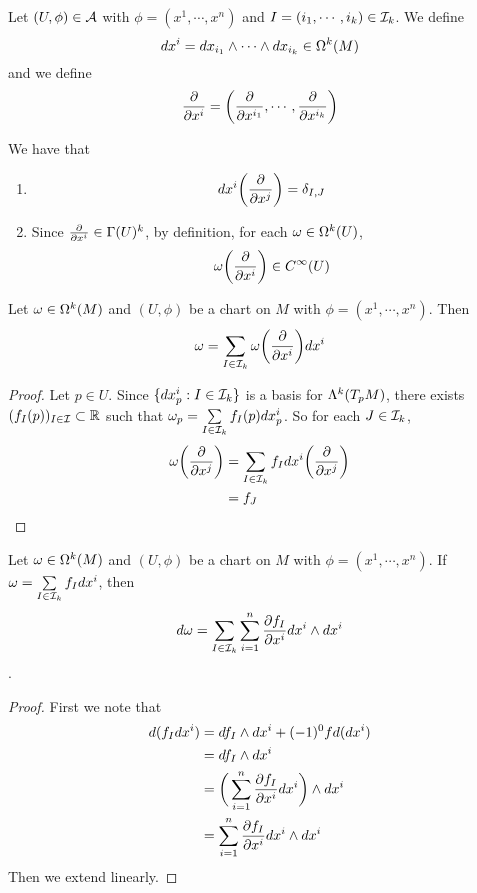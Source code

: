 \documentclass{book}
\begin{document}
	\begin{ex}
	
	\end{ex}

	\begin{defn}
		Let $(U, \phi) \in \mathcal{A}$ with $\phi = (x^1, \cdots, x^n)$ and $I = (i_1, \cdots, i_k) \in \mathcal{I}_k$. We define $$dx^i = dx_{i_1} \wedge \cdots \wedge dx_{i_k} \in \Omega^k(M)$$ 
		and we define $$\frac{\partial}{\partial x^i}= \bigg(\frac{\partial}{\partial x^{i_1}}, \cdots, \frac{\partial}{\partial x^{i_k}} \bigg)$$

	\end{defn}
	
	\begin{note} We have that
	\begin{enumerate}
	\item  $$d x^i \bigg (\frac{\partial}{\partial x^j} \bigg) = \delta_{I,J}$$
	\item Since $\frac{\partial}{\partial x^i} \in \Gamma(U)^k$, by definition, for each $\omega \in \Omega^k(U)$, $$\omega \bigg(\frac{\partial}{\partial x^i} \bigg) \in C^{\infty}(U)$$
	\end{enumerate}
	\end{note}

	\begin{ex}
		Let $\omega \in \Omega^k(M)$ and $(U, \phi)$ be a chart on $M$ with $\phi = (x^1, \cdots, x^n)$. Then $$\omega = \sum_{I \in \mathcal{I}_k}\omega \bigg(\frac{\partial}{\partial x^i} \bigg) dx^i$$
	\end{ex}

	\begin{proof}
		Let $p \in U$. Since $\{dx^i_p: I \in \mathcal{I}_k\}$ is a basis for $\Lambda^k(T_pM)$, there exists $(f_I(p))_{I \in \mathcal{I}} \subset \mathbb{R}$ such that $\omega_p = \sum\limits_{I \in \mathcal{I}_k} f_I(p) dx^i_p$. So for each $J \in \mathcal{I}_k$, 
		\begin{align*}
			\omega\bigg (\frac{\partial}{\partial x^j} \bigg ) 
			&= \sum\limits_{I \in \mathcal{I}_k} f_I dx^i \bigg (\frac{\partial}{\partial x^j} \bigg )  \\
			&= f_J
		\end{align*} 
	\end{proof}

	\begin{ex}
		Let $\omega \in \Omega^k(M)$ and $(U, \phi)$ be a chart on $M$ with $\phi = (x^1, \cdots, x^n)$. If $\omega = \sum\limits_{I \in \mathcal{I}_k}f_I dx^i$, then $$d \omega  = \sum_{I \in \mathcal{I}_k} \sum_{i =1}^n \frac{\partial f_I}{\partial x^i} dx^i \wedge dx^i$$.
	\end{ex}

	\begin{proof}
		First we note that
		\begin{align*}
			d(f_I dx^i) 
			&= df_I \wedge dx^i + (-1)^0 f d(dx^i) \\
			&= df_I \wedge dx^i \\
			&= \bigg( \sum\limits_{i=1}^n \frac{\partial f_I}{\partial x^i}dx^i  \bigg) \wedge dx^i \\
			&= \sum\limits_{i=1}^n {\frac{\partial f_I}{\partial x^i}}dx^i \wedge dx^i \\
		\end{align*}
		Then we extend linearly.
	\end{proof}
	
\end{document}
